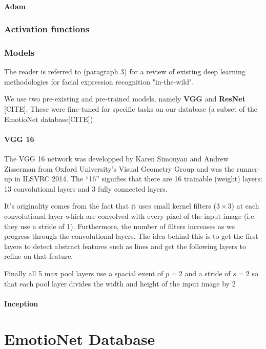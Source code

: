 \documentclass[12pt,twoside]{article}
\begin{document}
\paragraph{Adam}

\subsubsection{Activation functions}

\subsubsection{Models}

The reader is referred to \cite{RefWorks:2} (paragraph 3) for a review of existing deep learning methodologies for facial expression recognition "in-the-wild".

We  use two pre-existing and pre-trained models, namely \textbf{VGG} \cite{RefWorks:21} and
\textbf{ResNet} [CITE]. These were fine-tuned for specific tasks on our
database (a subset of the EmotioNet database[CITE])

\paragraph{VGG 16}

The VGG 16 network was developped by Karen Simonyan and Andrew Zisserman from
Oxford University's Visual Geometry Group and was the runner-up in ILSVRC 2014. 
The ``16'' signifies that there are 16 trainable (weight) layers: 13 convolutional
layers and 3 fully connected layers.

It's originality comes from the fact that it uses small kernel filters
($3 \times 3$) at each convolutional layer which are convolved with every
pixel of the input image (i.e. they use a stride of 1). Furthermore, 
the number of filters increases as we progress through the convolutional layers.
The idea behind this is to get the first layers to detect abstract features
such as lines and get the following layers to refine on that feature.

Finally all 5 max pool layers use a spacial exent of $p=2$ and a stride of
$s=2$ so that each pool layer divides the width and height of the input image
by 2 
 
\paragraph{Inception}

\section{EmotioNet Database}
 
\end{document}
